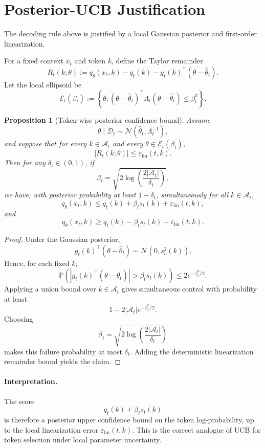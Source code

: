 \documentclass[11pt]{article}
\newtheorem{proposition}{Proposition}
\begin{document}
\section{Posterior-UCB Justification}

The decoding rule above is justified by a local Gaussian posterior and
first-order linearization.

For a fixed context $x_t$ and token $k$, define the Taylor remainder
\[
R_t(k;\theta)
:=
q_\theta(x_t,k)
-
q_t(k)
-
g_t(k)^\top(\theta-\hat\theta_t).
\]
Let the local ellipsoid be
\[
\mathcal{E}_t(\beta_t)
:=
\left\{
\theta:
(\theta-\hat\theta_t)^\top
\Lambda_t
(\theta-\hat\theta_t)
\le \beta_t^2
\right\}.
\]

\begin{proposition}[Token-wise posterior confidence bound]
Assume
\[
\theta \mid \mathcal{D}_t \sim \mathcal{N}(\hat\theta_t,\Lambda_t^{-1}),
\]
and suppose that for every $k\in\mathcal{A}_t$ and every
$\theta\in\mathcal{E}_t(\beta_t)$,
\[
|R_t(k;\theta)| \le \varepsilon_{\mathrm{lin}}(t,k).
\]
Then for any $\delta_t\in(0,1)$, if
\[
\beta_t = \sqrt{2\log\!\left(\frac{2|\mathcal{A}_t|}{\delta_t}\right)},
\]
we have, with posterior probability at least $1-\delta_t$,
simultaneously for all $k\in\mathcal{A}_t$,
\[
q_\theta(x_t,k)
\le
q_t(k)+\beta_t s_t(k)+\varepsilon_{\mathrm{lin}}(t,k),
\]
and
\[
q_\theta(x_t,k)
\ge
q_t(k)-\beta_t s_t(k)-\varepsilon_{\mathrm{lin}}(t,k).
\]
\end{proposition}

\begin{proof}
Under the Gaussian posterior,
\[
g_t(k)^\top(\theta-\hat\theta_t)
\sim
\mathcal{N}(0,s_t^2(k)).
\]
Hence, for each fixed $k$,
\[
\mathbb{P}\!\left(
\left|g_t(k)^\top(\theta-\hat\theta_t)\right|
>
\beta_t s_t(k)
\right)
\le
2e^{-\beta_t^2/2}.
\]
Applying a union bound over $k\in\mathcal{A}_t$ gives simultaneous control
with probability at least
\[
1 - 2|\mathcal{A}_t|e^{-\beta_t^2/2}.
\]
Choosing
\[
\beta_t = \sqrt{2\log\!\left(\frac{2|\mathcal{A}_t|}{\delta_t}\right)}
\]
makes this failure probability at most $\delta_t$.
Adding the deterministic linearization remainder bound yields the claim.
\end{proof}

\paragraph{Interpretation.}
The score
\[
q_t(k)+\beta_t s_t(k)
\]
is therefore a posterior upper confidence bound on the token
log-probability, up to the local linearization error
$\varepsilon_{\mathrm{lin}}(t,k)$.
This is the correct analogue of UCB for token selection under local
parameter uncertainty.
\end{document}
